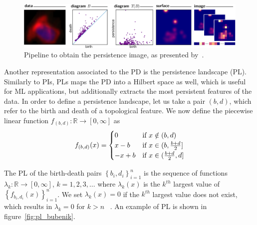\documentclass{article}
\begin{document}
\begin{figure}[htb]
  \begin{centering}
    \includegraphics[width=1.0\textwidth]{figures/cartoon.pdf}
    \caption{Pipeline to obtain the persistence image, as presented by~\citet{adams2017persistence}.}
    \label{fig:pipeline_persistence_image}
  \end{centering}
\end{figure}

Another representation associated to the PD is the persistence landscape (PL). Similarly to PIs, PLs
maps the PD into a Hilbert space as well, which is useful for ML applications, but additionally
extracts the most persistent features of the data. In order to define a persistence landscape, let
us take a pair $(b,d)$, which refer to the birth and death of a topological feature. We now define
the piecewise linear function $f_{(b,d)}:\mathbb{R} \to [0, \infty]$ as
\begin{equation}
  \label{eq:piecewise_linear_landscape}
  f_{(b,d)}(x)=
  \begin{cases}
    0 & \text{if }x \notin (b,d)\\ x-b & \text{if }x\in (b,{b+d\over 2}]\\ -x+b & \text{if }x\in
      ({b+d\over 2},d]
  \end{cases}
\end{equation}


The PL of the birth-death pairs $\left\{b_i,d_i\right\}_{i=1}^{n}$ is the sequence of functions
$\lambda_k:\mathbb{R}\to [0,\infty]$, $k=1,2,3,\ldots$ where $\lambda_k(x)$ is the $k^{th}$ largest
value of $\left\{f_{b_i, d_i}(x)\right\}^{n}_{i=1}$. We set $\lambda_k(x)=0$ if the $k^{th}$ largest
value does not exist, which results in $\lambda_k=0$ for $k>n$ ~\citep{bubenik2015statistical,
  bubenik2020persistence}. An example of PL is shown in figure~\ref{fig:pl_bubenik}.
\end{document}
